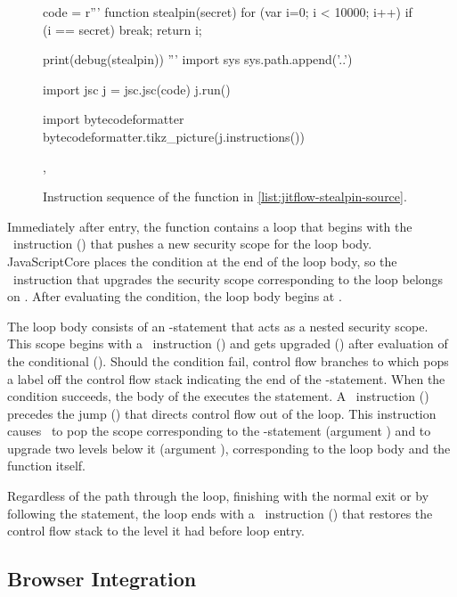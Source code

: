 \lstset{
}
\begin{figure}[h]
\begin{python}
code = r'''
function stealpin(secret) {
  for (var i=0; i < 10000; i++) {
    if (i == secret)
      break;
  }
  return i;
}

print(debug(stealpin))
'''
import sys
sys.path.append('..')

import jsc
j = jsc.jsc(code)
j.run()

import bytecodeformatter
bytecodeformatter.tikz_picture(j.instructions())
\end{python}
  \caption{Instruction sequence of the  function in \autoref{list:jitflow-stealpin-source}.},
  \label{list:jitflow-stealpin-bytecodes}
\end{figure}

Immediately after entry, the  function contains a loop that begins with the \dup\ instruction () that pushes a new security scope for the loop body.
JavaScriptCore places the condition at the end of the loop body, so the \join\ instruction that upgrades the security scope corresponding to the loop belongs on .
After evaluating the condition, the loop body begins at .

The loop body consists of an -statement that acts as a nested security scope.
This scope begins with a \dup\ instruction () and gets upgraded () after evaluation of the conditional ().
Should the condition fail, control flow branches to  which pops a label off the control flow stack indicating the end of the -statement.
When the condition succeeds, the body of the  executes the  statement.
A \popj\ instruction () precedes the jump () that directs control flow out of the loop.
This instruction causes \JitFlow\ to pop the scope corresponding to the -statement (argument ) and to upgrade two levels below it (argument ), corresponding to the loop body and the function itself.

Regardless of the path through the loop, finishing with the normal exit or by following the  statement, the loop ends with a \popj\ instruction () that restores the control flow stack to the level it had before loop entry.

\subsection{Browser Integration}


